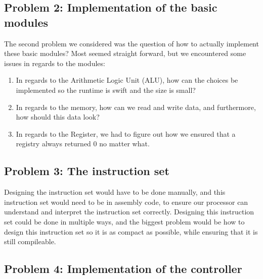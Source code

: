 \documentclass[12pt,a4paper]{article}
\begin{document}
\subsection{Problem 2: Implementation of the basic modules}
The second problem we considered was the question of how to actually implement these basic modules? Most seemed straight forward, but we encountered some issues in regards to the modules:\\
\begin{enumerate}
	\item In regards to the Arithmetic Logic Unit (ALU), how can the choices be implemented so the runtime is swift and the size is small?
	\item In regards to the memory, how can we read and write data, and furthermore, how should this data look?
	\item In regards to the Register, we had to figure out how we ensured that a registry always returned 0 no matter what.
\end{enumerate}
\subsection{Problem 3: The instruction set}
Designing the instruction set would have to be done manually, and this instruction set would need to be in assembly code, to ensure our processor can understand and interpret the instruction set correctly. Designing this instruction set could be done in multiple ways, and the biggest problem would be how to design this instruction set so it is as compact as possible, while ensuring that it is still compileable.

\subsection{Problem 4: Implementation of the controller}
\end{document}
